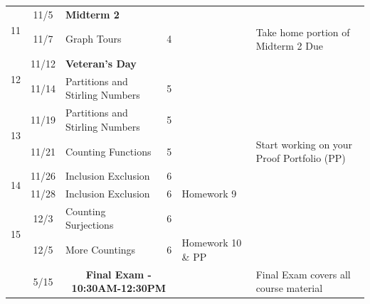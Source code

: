 \documentclass[11pt]{article}
\begin{document}
\begin{landscape}
\begin{tabular}{|c|c|l|l|l|l|}
\multirow{2}{*}{11}
& 11/5 & {\bf Midterm 2} &&&   \\ 
& 11/7 & Graph Tours &4& & Take home portion of Midterm 2 Due  \\ \hline

\multirow{2}{*}{12}
& 11/12 & {\bf Veteran's Day}&&&\\
& 11/14 & Partitions and Stirling Numbers&5&&\\ \hline

\multirow{2}{*}{13}
& 11/19 &Partitions and Stirling Numbers &5&&\\
& 11/21 & Counting Functions&5&&Start working on your Proof Portfolio (PP) \\ \hline

\multirow{2}{*}{14}
& 11/26 & Inclusion Exclusion &6&&\\ 
& 11/28 &Inclusion Exclusion &6&Homework 9 \\ \hline

\multirow{2}{*}{15}
& 12/3 & Counting Surjections &6&&\\
& 12/5  & More Countings &6 &Homework 10 \& PP&\\ \hline

& 5/15 & \multicolumn{2}{|c|}{{\bf Final Exam - 10:30AM-12:30PM}} && Final Exam covers all course material\\ \hline 

\end{tabular}
\end{landscape}
\end{document}
